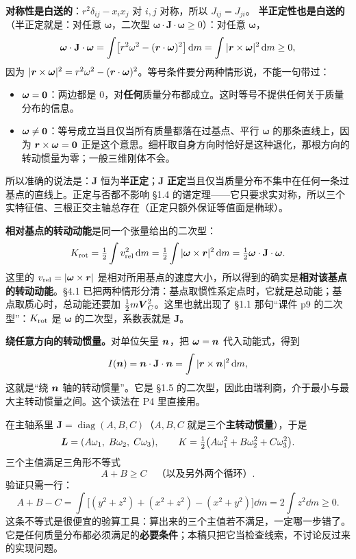 \documentclass[11pt]{ctexart}
\newcommand{\ten}[1]{\mathbf{#1}}
\let\origsubhdr\subhdr
\renewcommand{\subhdr}[1]{\par\needspace{3\baselineskip}\origsubhdr{#1}}
\begin{document}
\textbf{对称性是白送的}：$r^2\delta_{ij}-x_ix_j$ 对 $i,j$ 对称，所以 $J_{ij}=J_{ji}$。
\textbf{半正定性也是白送的}（半正定就是：对任意 $\boldsymbol\omega$，二次型 $\boldsymbol\omega\cdot\ten J\cdot\boldsymbol\omega\ge0$）：对任意 $\boldsymbol\omega$，
\[
\boldsymbol\omega\cdot\ten J\cdot\boldsymbol\omega
=\int\bigl[r^2\omega^2-(\vect r\cdot\boldsymbol\omega)^2\bigr]\dd m
=\int|\vect r\times\boldsymbol\omega|^2\dd m\ge0,
\]
因为 $|\boldsymbol{r}\times\boldsymbol\omega|^2=r^2\omega^2-(\boldsymbol{r}\cdot\boldsymbol\omega)^2$。等号条件要分两种情形说，不能一句带过：
\begin{itemize}[leftmargin=1.8em,itemsep=2pt]
\item $\boldsymbol\omega=\boldsymbol{0}$：两边都是 $0$，对\textbf{任何}质量分布都成立。这时等号不提供任何关于质量分布的信息。
\item $\boldsymbol\omega\ne\boldsymbol{0}$：等号成立当且仅当所有质量都落在过基点、平行 $\boldsymbol\omega$ 的那条直线上，因为 $\boldsymbol{r}\times\boldsymbol\omega=\boldsymbol{0}$ 正是这个意思。细杆取自身方向时恰好是这种退化，那根方向的转动惯量为零；一般三维刚体不会。
\end{itemize}
所以准确的说法是：$\ten J$ 恒为\textbf{半正定}；$\ten J$ \textbf{正定}当且仅当质量分布不集中在任何一条过基点的直线上。正定与否都不影响 \S1.4 的谱定理——它只要求实对称，所以三个实特征值、三根正交主轴总存在（正定只额外保证等值面是椭球）。

\textbf{相对基点的转动动能}是同一个张量给出的二次型：
\[
K_{\rm rot}=\tfrac12\int v_{\rm rel}^2\dd m
=\tfrac12\int|\boldsymbol\omega\times\vect r|^2\dd m
=\tfrac12\boldsymbol\omega\cdot\ten J\cdot\boldsymbol\omega .
\]
这里的 $v_{\rm rel}=|\boldsymbol\omega\times\boldsymbol{r}|$ 是相对所用基点的速度大小，所以得到的确实是\textbf{相对该基点的转动动能}。\S4.1 已把两种情形分清：基点取惯性系定点时，它就是总动能；基点取质心时，总动能还要加 $\frac12m\boldsymbol{V}_C^2$。这里也就出现了 \S1.1 那句“课件 p9 的二次型”：$K_{\rm rot}$ 是 $\boldsymbol\omega$ 的二次型，系数表就是 $\ten J$。

\textbf{绕任意方向的转动惯量。}对单位矢量 $\boldsymbol{n}$，把 $\boldsymbol\omega=\boldsymbol{n}$ 代入动能式，得到
\[
I(\vect n)=\vect n\cdot\ten J\cdot\vect n=\int|\vect r\times\vect n|^2\dd m,
\]
这就是“绕 $\boldsymbol{n}$ 轴的转动惯量”。它是 \S1.5 的二次型，因此由瑞利商，介于最小与最大主转动惯量之间。这个读法在 P4 里直接用。

\label{subsec:principal}

在主轴系里 $\ten J=\operatorname{diag}(A,B,C)$（$A,B,C$ 就是三个\textbf{主转动惯量}），于是
\[
\boldsymbol{L}=(A\omega_1,\;B\omega_2,\;C\omega_3),
\qquad
K=\tfrac12\bigl(A\omega_1^2+B\omega_2^2+C\omega_3^2\bigr).
\]
三个主值满足三角形不等式
\[
A+B\ge C\quad\text{（以及另外两个循环）}.
\]
验证只需一行：
\[
A+B-C=\int\bigl[(y^2+z^2)+(x^2+z^2)-(x^2+y^2)\bigr]\dd m=2\int z^2\dd m\ge0 .
\]
这条不等式是很便宜的验算工具：算出来的三个主值若不满足，一定哪一步错了。它是任何质量分布都必须满足的\textbf{必要条件}；本稿只把它当检查线索，不讨论反过来的实现问题。
\end{document}
